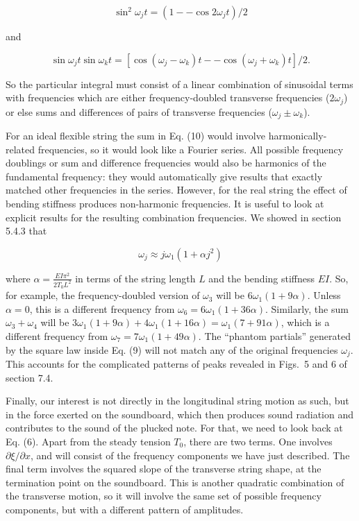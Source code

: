   $$\sin^2 \omega_j t = (1 -- \cos 2 \omega_j t)/2 \tag{11}$$ 

  and 

  $$\sin \omega_j t \sin \omega_k t = [\cos (\omega_j -\omega_k)t -- \cos 
  (\omega_j +\omega_k)t]/2 . \tag{12}$$ 

  So the particular integral must consist of a linear combination of sinusoidal 
  terms with frequencies which are either frequency-doubled transverse 
  frequencies ($2 \omega_j$) or else sums and differences of pairs of 
  transverse frequencies ($\omega_j \pm \omega_k$). 

  For an ideal flexible string the sum in Eq. (10) would involve 
  harmonically-related frequencies, so it would look like a Fourier series. All 
  possible frequency doublings or sum and difference frequencies would also be 
  harmonics of the fundamental frequency: they would automatically give results 
  that exactly matched other frequencies in the series. However, for the real 
  string the effect of bending stiffness produces non-harmonic frequencies. It 
  is useful to look at explicit results for the resulting combination 
  frequencies. We showed in section 5.4.3 that 

  $$\omega_j \approx j \omega_1 (1+\alpha j^2) \tag{13}$$ 

  where $\alpha=\frac{EI\pi^2}{2T_0 L^2}$ in terms of the string length $L$ and 
  the bending stiffness $EI$. So, for example, the frequency-doubled version of 
  $\omega_3$ will be $6 \omega_1 (1+9 \alpha)$. Unless $\alpha = 0$, this is a 
  different frequency from $\omega_6 = 6 \omega_1 (1+36 \alpha)$. Similarly, 
  the sum $\omega_3 + \omega_4$ will be $3 \omega_1 (1+9 \alpha) + 4 
  \omega_1(1+16 \alpha) = \omega_1 (7 + 91 \alpha)$, which is a different 
  frequency from $\omega_7 = 7 \omega_1 (1+49 \alpha)$. The ``phantom 
  partials'' generated by the square law inside Eq. (9) will not match any of 
  the original frequencies $\omega_j$. This accounts for the complicated 
  patterns of peaks revealed in Figs.\ 5 and 6 of section 7.4. 

  Finally, our interest is not directly in the longitudinal string motion as 
  such, but in the force exerted on the soundboard, which then produces sound 
  radiation and contributes to the sound of the plucked note. For that, we need 
  to look back at Eq. (6). Apart from the steady tension $T_0$, there are two 
  terms. One involves $\partial \xi/\partial x$, and will consist of the 
  frequency components we have just described. The final term involves the 
  squared slope of the transverse string shape, at the termination point on the 
  soundboard. This is another quadratic combination of the transverse motion, 
  so it will involve the same set of possible frequency components, but with a 
  different pattern of amplitudes. 


